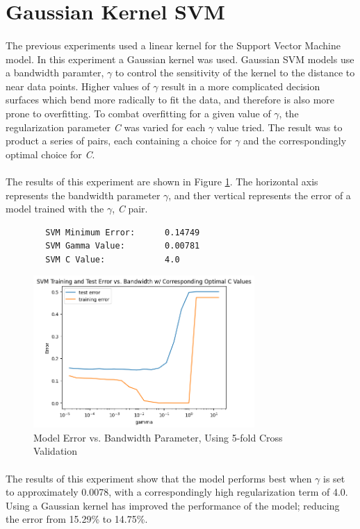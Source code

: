 \documentclass[12pt, letterpaper]{article}
\begin{document}
\section{Gaussian Kernel SVM}

\paragraph*{}The previous experiments used a linear kernel for the Support Vector
Machine model. In this experiment a Gaussian kernel was used. Gaussian SVM models
use a bandwidth paramter, $\gamma$ to control the sensitivity of the kernel to 
the distance to near data points. Higher values of $\gamma$ result in a more 
complicated decision surfaces which bend more radically to fit the data, and
therefore is also more prone to overfitting. To combat overfitting for a given
value of $\gamma$, the regularization parameter \textit{C} was varied for each $\gamma$
value tried. The result was to product a series of pairs, each containing a choice
for $\gamma$ and the correspondingly optimal choice for \textit{C}.

\paragraph*{}The results of this experiment are shown in Figure \ref{fig:7}. The
horizontal axis represents the bandwidth parameter $\gamma$, and ther vertical
represents the error of a model trained with the $\gamma$, \textit{C} pair.

\begin{verbatim}
        SVM Minimum Error:      0.14749
        SVM Gamma Value:        0.00781
        SVM C Value:            4.0
\end{verbatim}

\begin{figure}[ht]
    \centering
    \includegraphics[width=0.75\textwidth]{5.png}
    \caption{Model Error vs. Bandwidth Parameter, Using 5-fold Cross Validation}
    \label{fig:7}
\end{figure}

\paragraph*{}The results of this experiment show that the model performs best
when $\gamma$ is set to approximately 0.0078, with a correspondingly high regularization
term of 4.0. Using a Gaussian kernel has improved the performance of the model;
reducing the error from 15.29\% to 14.75\%.
\end{document}
